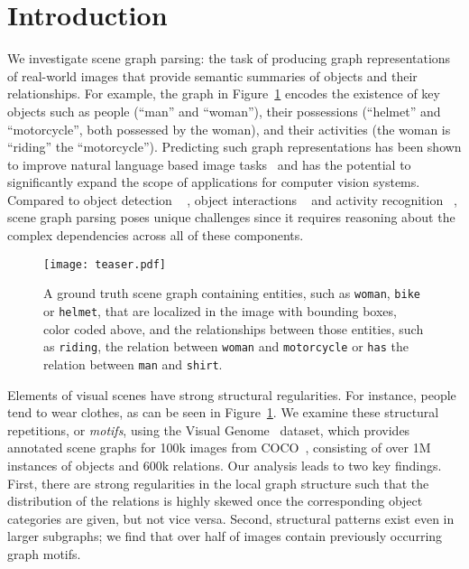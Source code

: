 \documentclass[10pt,twocolumn,letterpaper]{article}
\newcommand{\yc}[1]{{\color{purple}yc:[#1]}}
\newcommand{\my}[1]{{\color{orange}my:[#1]}}
\begin{document}
\section{Introduction}
We investigate scene graph parsing: the task of producing graph representations of real-world images that provide semantic summaries of objects and their relationships.
For example, the graph in Figure~\ref{fig:teaser} encodes the existence of key objects such as people (``man'' and ``woman''), their possessions (``helmet'' and ``motorcycle'', both possessed by the woman), and their activities (the woman is ``riding'' the ``motorcycle'').
Predicting such graph representations has been shown to improve natural language based image tasks~\cite{johnson_image_2015,Teney2016GraphStructuredRF,Yin2017Obj2TextGV}%
and has the potential to significantly expand the scope of applications for computer vision systems.
Compared to object detection ~\cite{ren_faster_2015, redmon_yolo9000:_2016} , object interactions ~\cite{yao2010modeling,chao:iccv2015} and activity recognition ~\cite{2014survey}, %
scene graph parsing poses unique challenges since %
it requires reasoning about the complex dependencies across all of these components.

\begin{figure}
    \centering
    \texttt{[image: teaser.pdf]}
    \caption{A ground truth scene graph containing entities, such as \texttt{woman}, \texttt{bike} or \texttt{helmet}, that are localized in the image with bounding boxes, color coded above, and the relationships between those entities, such as \texttt{riding}, the relation between \texttt{woman} and \texttt{motorcycle} or \texttt{has} the relation between \texttt{man} and \texttt{shirt}.
    }
    \label{fig:teaser}
\end{figure}%
Elements of visual scenes have strong structural regularities.
For instance, people tend to wear clothes, as can be seen in Figure~\ref{fig:teaser}.
We examine these structural repetitions, or \emph{motifs}, using the Visual Genome~\cite{visualgenome} dataset, which provides annotated scene graphs for 100k images from COCO~\cite{mscoco}, consisting of over 1M instances of objects and 600k relations.
Our analysis leads to two key findings.
First, there are strong regularities in the local graph structure such that
the distribution of the relations is highly skewed once the corresponding object categories are given, but not vice versa.
Second, structural patterns exist even in larger
subgraphs; we find that over half of images contain previously occurring graph motifs. %
\end{document}
